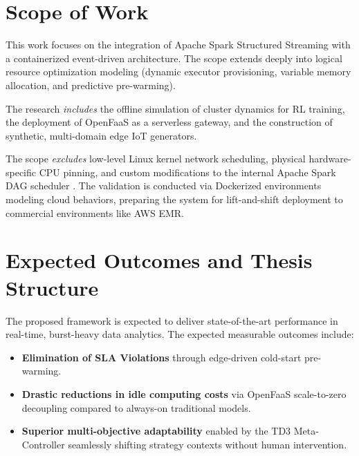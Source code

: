 \section{Scope of Work}

This work focuses on the integration of Apache Spark Structured Streaming with a containerized event-driven architecture. The scope extends deeply into logical resource optimization modeling (dynamic executor provisioning, variable memory allocation, and predictive pre-warming).

The research \textit{includes} the offline simulation of cluster dynamics for RL training, the deployment of OpenFaaS as a serverless gateway, and the construction of synthetic, multi-domain edge IoT generators. 

The scope \textit{excludes} low-level Linux kernel network scheduling, physical hardware-specific CPU pinning, and custom modifications to the internal Apache Spark DAG scheduler \cite{pu2019shuffling}. The validation is conducted via Dockerized environments modeling cloud behaviors, preparing the system for lift-and-shift deployment to commercial environments like AWS EMR.

\section{Expected Outcomes and Thesis Structure}

The proposed framework is expected to deliver state-of-the-art performance in real-time, burst-heavy data analytics. The expected measurable outcomes include:
\begin{itemize}
  \item \textbf{Elimination of SLA Violations} through edge-driven cold-start pre-warming.
  \item \textbf{Drastic reductions in idle computing costs} via OpenFaaS scale-to-zero decoupling compared to always-on traditional models.
  \item \textbf{Superior multi-objective adaptability} enabled by the TD3 Meta-Controller seamlessly shifting strategy contexts without human intervention.
\end{itemize}

